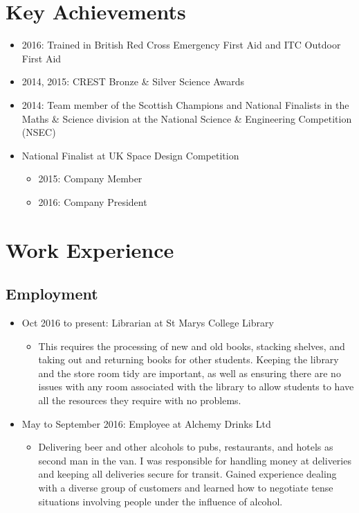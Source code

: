 \documentclass[10pt, a4paper]{article}
\begin{document}
\section{Key Achievements}
\begin{itemize}
	\item 2016: Trained in British Red Cross Emergency First Aid and ITC Outdoor First Aid
	\item 2014, 2015: CREST Bronze \& Silver Science Awards
	\item 2014: Team member of the Scottish Champions and National Finalists in the Maths \& Science division at the National Science \& Engineering Competition (NSEC)
	\item National Finalist at UK Space Design Competition
	\begin{itemize}
		\item 2015: Company Member
		\item 2016: Company President
	\end{itemize}
\end{itemize}
\section{Work Experience}
	\subsection{Employment}
	\begin{itemize}
		\item Oct 2016 to present: Librarian at St Mary{\textquotesingle}s College Library
		\begin{itemize}
			\item This requires the processing of new and old books, stacking shelves, and taking out and returning books for other students. Keeping the library and the store room tidy are important, as well as ensuring there are no issues with any room associated with the library to allow students to have all the resources they require with no problems.
		\end{itemize}
		\item May to September 2016: Employee at Alchemy Drinks Ltd
		\begin{itemize}
			\item Delivering beer and other alcohols to pubs, restaurants, and hotels as second man in the van. I was responsible for handling money at deliveries and keeping all deliveries secure for transit. Gained experience dealing with a diverse group of customers and learned how to negotiate tense situations involving people under the influence of alcohol.
		\end{itemize}
	\end{itemize}
\end{document}
